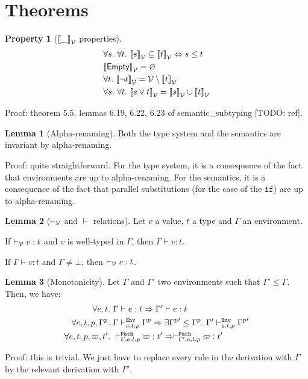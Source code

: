 \documentclass[a4paper]{article}
\theoremstyle{definition}
\newtheorem{lemma}{Lemma}
\newtheorem{property}{Property}
\begin{document}
    \section{Theorems}

        \begin{property}[$\valsemantic \_$ properties]
          \begin{align*}
            &\forall s.\ \forall t.\ \valsemantic s \subseteq \valsemantic t \Leftrightarrow s \leq t\\
            &\valsemantic \Empty = \varnothing\\
            &\forall t.\ \valsemantic {\neg t} = \values \setminus \valsemantic t\\
            &\forall s.\ \forall t.\ \valsemantic {s\vee t} = \valsemantic s \cup \valsemantic t
          \end{align*}
        \end{property}
        Proof: theorem 5.5, lemmas 6.19, 6.22, 6.23 of semantic_subtyping [TODO: ref].

        \begin{lemma}[Alpha-renaming]
          Both the type system and the semantics are invariant by alpha-renaming.
        \end{lemma}
        Proof: quite straightforward.
        For the type system, it is a consequence of the fact that environments are up to alpha-renaming.
        For the semantics, it is a consequence of the fact that parallel substitutions (for the case of the $\texttt{if}$)
        are up to alpha-renaming.

        \begin{lemma}[$\vvdash$ and $\vdash$ relations]Let $v$ a value, $t$ a type and $\Gamma$ an environment.

          If $\vvdash v:t$ and $v$ is well-typed in $\Gamma$, then $\Gamma\vdash v:t$.

          If $\Gamma \vdash v:t$ and $\Gamma\neq\bot$, then $\vvdash v:t$.
        \end{lemma}
    
        \begin{lemma}[Monotonicity]
          Let $\Gamma$ and $\Gamma'$ two environments such that $\Gamma' \leq \Gamma$.
          Then, we have:
          \begin{align*}
            \forall e,t.\ &\Gamma \vdash e:t \Rightarrow \Gamma' \vdash e:t\\
            \forall e,t,p,\Gamma^p.\ &\Gamma \evdash p e t \Gamma^p \Rightarrow \exists {\Gamma^p}'\leq \Gamma^p.\ \Gamma' \evdash p e t {\Gamma^p}'\\
            \forall e,t,p,\varpi,t'.\ &\pvdash \Gamma p e t \varpi:t' \Rightarrow \pvdash {\Gamma'} p e t \varpi:t'
          \end{align*}
        \end{lemma}
        Proof: this is trivial. We just have to replace every  rule in the derivation with $\Gamma$
        by the relevant derivation with $\Gamma'$.
\end{document}
